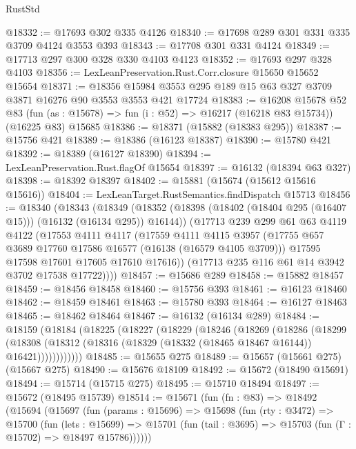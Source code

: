\begin{lexlean}{RustStd}
\begin{coremodule}
@18332 := @17693 @302 @335 @4126
@18340 := @17698 @289 @301 @331 @335 @3709 @4124 @3553 @393
@18343 := @17708 @301 @331 @4124
@18349 := @17713 @297 @300 @328 @330 @4103 @4123
@18352 := @17693 @297 @328 @4103
@18356 := LexLeanPreservation.Rust.Corr.closure @15650 @15652 @15654
@18371 := @18356 @15984 @3553 @295 @189 @15 @63 @327 @3709 @3871 @16276 @90 @3553 @3553 @421 @17724
@18383 := @16208
    @15678
    @52
    @83
    (fun (as : @15678) => fun (i : @52) => @16217 (@16218 @83 @15734))
    (@16225 @83)
    @15685
@18386 := @18371 (@15882 (@18383 @295))
@18387 := @15756 @421
@18389 := @18386 (@16123 @18387)
@18390 := @15780 @421
@18392 := @18389 (@16127 @18390)
@18394 := LexLeanPreservation.Rust.flagOf @15654
@18397 := @16132 (@18394 @63 @327)
@18398 := @18392 @18397
@18402 := @15881 (@15674 (@15612 @15616 @15616))
@18404 := LexLeanTarget.RustSemantics.findDispatch @15713
@18456 := @18340
    (@18343
      (@18349
        (@18352 (@18398 (@18402 (@18404 @295 (@16407 @15))) (@16132 (@16134 @295)) @16144))
        (@17713
          @239
          @299
          @61
          @63
          @4119
          @4122
          (@17553
            @4111
            @4117
            (@17559
              @4111
              @4115
              @3957
              (@17755 @657 @3689 @17760 @17586 @16577 (@16138 (@16579 @4105 @3709)))
              @17595
              @17598
              @17601
              @17605
              @17610
              @17616))
          (@17713 @235 @116 @61 @14 @3942 @3702 @17538 @17722))))
@18457 := @15686 @289
@18458 := @15882 @18457
@18459 := @18456 @18458
@18460 := @15756 @393
@18461 := @16123 @18460
@18462 := @18459 @18461
@18463 := @15780 @393
@18464 := @16127 @18463
@18465 := @18462 @18464
@18467 := @16132 (@16134 @289)
@18484 := @18159
    (@18184
      (@18225
        (@18227
          (@18229
            (@18246
              (@18269
                (@18286
                  (@18299
                    (@18308
                      (@18312 (@18316 (@18329 (@18332 (@18465 @18467 @16144)) @16421))))))))))))
@18485 := @15655 @275
@18489 := @15657 (@15661 @275) (@15667 @275)
@18490 := @15676 @18109
@18492 := @15672 (@18490 @15691)
@18494 := @15714 (@15715 @275)
@18495 := @15710 @18494
@18497 := @15672 (@18495 @15739)
@18514 := @15671
    (fun (fn : @83) =>
    @18492
      (@15694
        (@15697
          (fun (params : @15696) =>
          @15698
            (fun (rty : @3472) =>
            @15700
              (fun (lets : @15699) =>
              @15701 (fun (tail : @3695) => @15703 (fun (Γ : @15702) => @18497 @15786))))))

\end{coremodule}
\end{lexlean}
